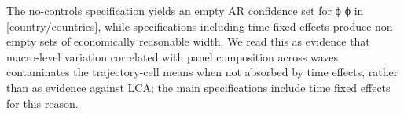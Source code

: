 
The no-controls specification yields an empty AR confidence set for ϕ\phi
ϕ in [country/countries], while specifications including time fixed effects produce non-empty sets of economically reasonable width. We read this as evidence that macro-level variation correlated with panel composition across waves contaminates the trajectory-cell means when not absorbed by time effects, rather than as evidence against LCA; the main specifications include time fixed effects for this reason.

